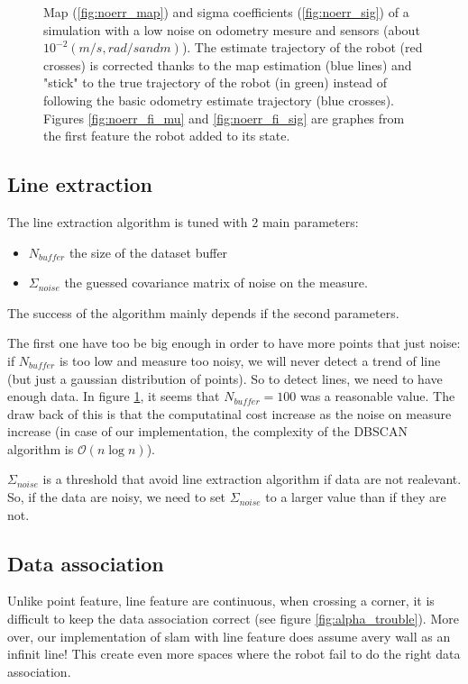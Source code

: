 \documentclass[a4paper,12pt]{article}
\begin{document}
\begin{figure}
        \caption{Map (\ref{fig:noerr_map}) and sigma coefficients (\ref{fig:noerr_sig}) of a simulation with a low noise on odometry mesure and sensors (about $10^{-2}(m/s, rad/s and m)$). The estimate trajectory of the robot (red crosses) is corrected thanks to the map estimation (blue lines) and "stick" to the true trajectory of the robot (in green) instead of following the basic odometry estimate trajectory (blue crosses). Figures \ref{fig:noerr_fi_mu} and \ref{fig:noerr_fi_sig} are graphes from the first feature the robot added to its state.}
\label{fig:noerr}
\end{figure}

\subsection{Line extraction}

The line extraction algorithm is tuned with 2 main parameters:
\begin{itemize}
	\item $N_{buffer}$ the size of the dataset buffer
	\item $\Sigma_{noise}$ the guessed covariance matrix of noise on the measure.
\end{itemize}
The success of the algorithm mainly depends if the second parameters. 

The first one have too be big enough in order to have more points that just noise: if $N_{buffer}$ is too low and measure too noisy, we will never detect a trend of line (but just a gaussian distribution of points). So to detect lines, we need to have enough data. In figure \ref{fig:noerr}, it seems that $N_{buffer} = 100$ was a reasonable value.
The draw back of this is that the computatinal cost increase as the noise on measure increase (in case of our implementation, the complexity of the DBSCAN algorithm is $\mathcal{O}(n\log{}n)$).

$\Sigma_{noise}$ is a threshold that avoid line extraction algorithm if data are not realevant. So, if the data are noisy, we need to set $\Sigma_{noise}$ to a larger value than if they are not.


\subsection{Data association}

Unlike point feature, line feature are continuous, when crossing a corner, it is difficult to keep the data association correct (see figure \ref{fig:alpha_trouble}).
More over, our implementation of slam with line feature does assume avery wall as an infinit line! 
This create even more spaces where the robot fail to do the right data association.
\end{document}
